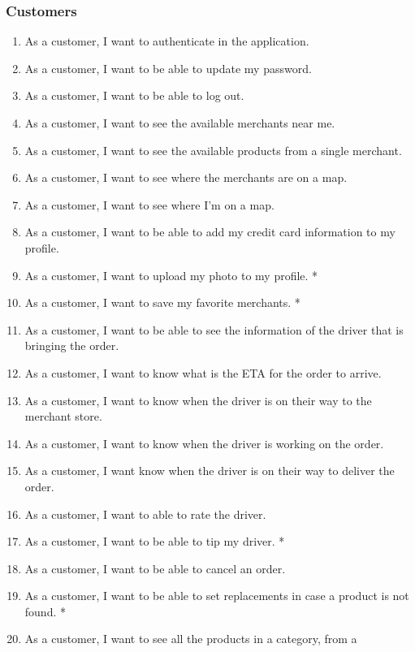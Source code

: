 \subsubsection{Customers}
\begin{enumerate}[resume, label=USR-\arabic*]
    \item As a customer, I want to authenticate in the application.
    \item As a customer, I want to be able to update my password.
    \item As a customer, I want to be able to log out.
    \item As a customer, I want to see the available merchants near me.
    \item As a customer, I want to see the available products from a single 
    merchant.
    \item As a customer, I want to see where the merchants are on a map.
    \item As a customer, I want to see where I’m on a map.
    \item As a customer, I want to be able to add my credit card information 
    to my profile.
    \item As a customer, I want to upload my photo to my profile. *
    \item As a customer, I want to save my favorite merchants. *
    \item As a customer, I want to be able to see the information of the driver 
    that is bringing the order.
    \item As a customer, I want to know what is the ETA for the order to arrive.
    \item As a customer, I want to know when the driver is on their way to the 
    merchant store.
    \item As a customer, I want to know when the driver is working on the order.
    \item As a customer, I want know when the driver is on their way to deliver 
    the order.
    \item As a customer, I want to able to rate the driver.
    \item As a customer, I want to be able to tip my driver. *
    \item As a customer, I want to be able to cancel an order.
    \item As a customer, I want to be able to set replacements in case a 
    product is not found. *
    \item As a customer, I want to see all the products in a category, from a 

\end{enumerate}
